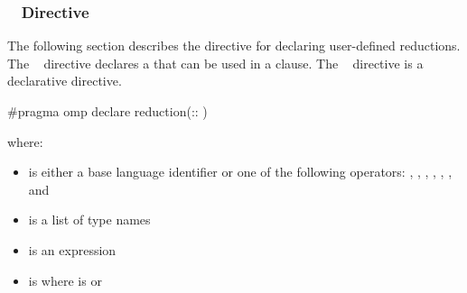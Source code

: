 \subsubsection{~ Directive}
\label{subsubsec:declare reduction Directive}
\summary
The following section describes the directive for declaring user-defined reductions. The
~ directive declares a  that can be used in a
 clause. The ~ directive is a declarative directive.

\syntax
\begin{cspecific}
\begin{ompcPragma}
#pragma omp declare reduction(::
)
\end{ompcPragma}

where:

\begin{itemize}

\item {} is either a base language identifier or one of the following
operators:
\code{+},
\code{-},
\code{*},
\code{&},
\code{|},
\code{^},
\code{&&} and
\code{||}

\item {} is a list of type names

\item {} is an expression

\item {} is \code{)}
where  is\linebreak
{} or \code{(}\code{)}
\end{itemize}
\end{cspecific}


